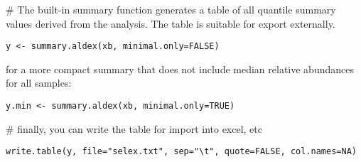 \documentclass[11pt]{article}
\begin{document}
\noindent\#  The built-in summary function generates a table of all quantile summary values derived from the analysis. The table is suitable for export externally. \\

\noindent\begin{verbatim}y <- summary.aldex(xb, minimal.only=FALSE)\end{verbatim}
for a more compact summary that does not include median relative abundances for all samples:\\
\noindent\begin{verbatim}y.min <- summary.aldex(xb, minimal.only=TRUE)\end{verbatim}

\noindent\# finally, you can write the table for import into excel, etc\\
\begin{verbatim}write.table(y, file="selex.txt", sep="\t", quote=FALSE, col.names=NA)\end{verbatim}
\end{document}
